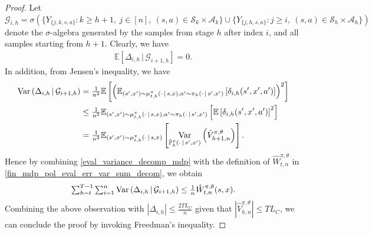 \documentclass[10pt,a4paper]{amsart}
\newcommand{\EE}{\mathbb{E}}
\newcommand{\PP}{\mathbb{P}}
\DeclareMathOperator{\Var}{{\rm Var}}
\newcommand{\abr}[1]{\left|#1\right|}
\newcommand{\cA}{\mathcal{A}}
\newcommand{\cG}{\mathcal{G}}
\newcommand{\cS}{{\mathcal{S}}}
\renewcommand{\frac}[2]{\tfrac{#1}{#2}}
\def\given{{\,|\,}}
\newcommand{\rbr}[1]{\left(#1\right)}
\newcommand{\sbr}[1]{\left[#1\right]}
\newcommand\tsum{\textstyle\sum\nolimits}
\begin{document}
\begin{proof}
Let 
$
\cG_{i,h}
=
\sigma (
\{Y_{\{j,k,s,a\}}: k\geq h+1,\ j\in[n],\ (s,a)\in\cS_k\times\cA_k\}
\cup
\{Y_{\{j,h,s,a\}}: j\ge i,\ (s,a)\in\cS_h\times\cA_h\}
)
$
denote the $\sigma$-algebra generated by the samples from stage $h$ after index $i$, and all samples starting from $h+1$.
Clearly, we have
\begin{align*}
    \EE\sbr{\Delta_{i,h}\given \cG_{i+1,h}}=
    0 .
\end{align*}
In addition, from Jensen's inequality, we have
\begin{align}
    \Var\rbr{\Delta_{i,h}\given \cG_{i+1,h}}
    & = \frac{1}{n^2} \EE \sbr{ \rbr{
    \EE_{{(s',x')\sim \mu_{t,h}^{\pi}(\cdot\given s,x) 
    , a'\sim \pi_h(\cdot\given s',x')}}
    \sbr{
   \delta_{i, h}(s', x', a')
    }
    }^2
    } \nonumber  \\
    & \leq 
    \frac{1}{n^2} \EE_{{(s',x')\sim \mu_{t,h}^{\pi}(\cdot\given s,x) 
    , a'\sim \pi_h(\cdot\given s',x')}} \sbr{ 
    \EE \sbr{
   \delta_{i, h}(s', x', a')
    }^2
    } \nonumber  \\
    & =
    \frac{1}{n^2}
    \EE_{(s',x')\sim \mu_{t,h}^{\pi}(\cdot\given s,x)}
    \sbr{
    \Var_{\tilde{\PP}_h^\pi(\cdot\given s',x')}
    \rbr{\hat V_{h+1,n}^{\pi,\theta}}
    } . \label{eval_variance_decomp_mdp}
\end{align}
Hence by combining \eqref{eval_variance_decomp_mdp} with the definition of $\hat{W}_{t,n}^{\pi, \theta}$ in \eqref{fin_mdp_pol_eval_err_var_sum_decom}, we obtain
\begin{align*}
    \tsum_{h=t}^{T-1}\tsum_{i=1}^n
    \Var\rbr{\Delta_{i,h}\given \cG_{i+1,h}}
    \le
    \frac{1}{n}\hat W_{t,n}^{\pi,\theta}(s,x).
\end{align*}
Combining the above observation with  $
\abr{\Delta_{i,h}}\leq \frac{2T L_C}{n}$ given that $|{\hat{V}^{\pi,\theta}_{h,n}}| 
\leq TL_C$, we can conclude the proof by invoking  Freedman's inequality. 
\end{proof}
\end{document}

